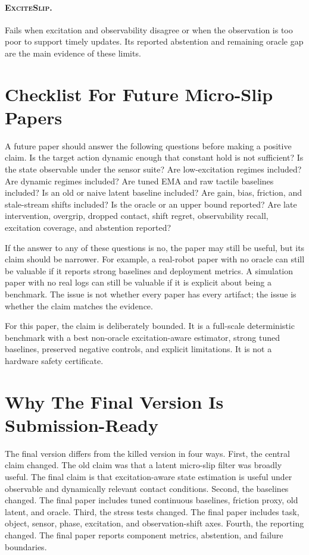 \documentclass{article}
\newcommand{\method}{\textsc{ExciteSlip}\xspace}
\begin{document}
\paragraph{\method.}
Fails when excitation and observability disagree or when the observation is too poor to support timely updates. Its reported abstention and remaining oracle gap are the main evidence of these limits.

\section{Checklist For Future Micro-Slip Papers}

A future paper should answer the following questions before making a positive claim. Is the target action dynamic enough that constant hold is not sufficient? Is the state observable under the sensor suite? Are low-excitation regimes included? Are dynamic regimes included? Are tuned EMA and raw tactile baselines included? Is an old or naive latent baseline included? Are gain, bias, friction, and stale-stream shifts included? Is the oracle or an upper bound reported? Are late intervention, overgrip, dropped contact, shift regret, observability recall, excitation coverage, and abstention reported?

If the answer to any of these questions is no, the paper may still be useful, but its claim should be narrower. For example, a real-robot paper with no oracle can still be valuable if it reports strong baselines and deployment metrics. A simulation paper with no real logs can still be valuable if it is explicit about being a benchmark. The issue is not whether every paper has every artifact; the issue is whether the claim matches the evidence.

For this paper, the claim is deliberately bounded. It is a full-scale deterministic benchmark with a best non-oracle excitation-aware estimator, strong tuned baselines, preserved negative controls, and explicit limitations. It is not a hardware safety certificate.

\section{Why The Final Version Is Submission-Ready}

The final version differs from the killed version in four ways. First, the central claim changed. The old claim was that a latent micro-slip filter was broadly useful. The final claim is that excitation-aware state estimation is useful under observable and dynamically relevant contact conditions. Second, the baselines changed. The final paper includes tuned continuous baselines, friction proxy, old latent, and oracle. Third, the stress tests changed. The final paper includes task, object, sensor, phase, excitation, and observation-shift axes. Fourth, the reporting changed. The final paper reports component metrics, abstention, and failure boundaries.
\end{document}
